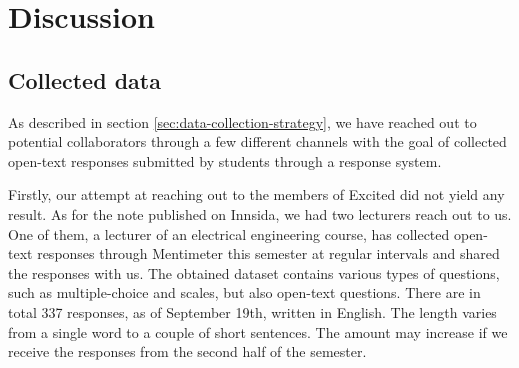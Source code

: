 \chapter{Discussion}\label{sec:discussion}

\section{Collected data}

As described in section \ref{sec:data-collection-strategy}, we have reached out to potential collaborators through a few different channels with the goal of collected open-text responses submitted by students through a response system.

Firstly, our attempt at reaching out to the members of Excited did not yield any result. As for the note published on Innsida, we had two lecturers reach out to us. One of them, a lecturer of an electrical engineering course, has collected open-text responses through Mentimeter this semester at regular intervals and shared the responses with us. The obtained dataset contains various types of questions, such as multiple-choice and scales, but also open-text questions. There are in total 337 responses, as of September 19th, written in English. The length varies from a single word to a couple of short sentences. The amount may increase if we receive the responses from the second half of the semester.

